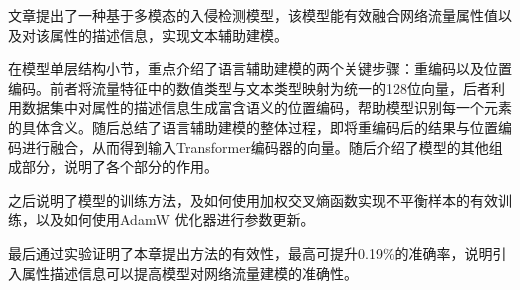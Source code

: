 文章提出了一种基于多模态的入侵检测模型，该模型能有效融合网络流量属性值以及对该属性的描述信息，实现文本辅助建模。

在模型单层结构小节，重点介绍了语言辅助建模的两个关键步骤：重编码以及位置编码。前者将流量特征中的数值类型与文本类型映射为统一的128位向量，后者利用数据集中对属性的描述信息生成富含语义的位置编码，帮助模型识别每一个元素的具体含义。随后总结了语言辅助建模的整体过程，即将重编码后的结果与位置编码进行融合，从而得到输入Transformer编码器的向量。随后介绍了模型的其他组成部分，说明了各个部分的作用。

之后说明了模型的训练方法，及如何使用加权交叉熵函数实现不平衡样本的有效训练，以及如何使用AdamW 优化器进行参数更新。

最后通过实验证明了本章提出方法的有效性，最高可提升0.19\%的准确率，说明引入属性描述信息可以提高模型对网络流量建模的准确性。